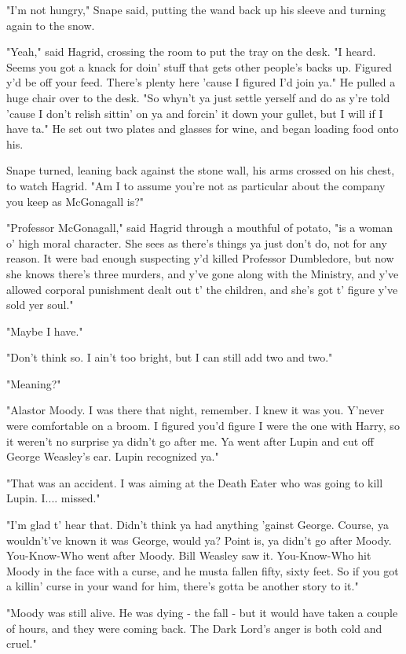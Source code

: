 "I'm not hungry," Snape said, putting the wand back up his sleeve and turning again to the snow.

"Yeah," said Hagrid, crossing the room to put the tray on the desk. "I heard. Seems you got a knack for doin' stuff that gets other people's backs up. Figured y'd be off your feed. There's plenty here 'cause I figured I'd join ya." He pulled a huge chair over to the desk. "So whyn't ya just settle yerself and do as y're told 'cause I don't relish sittin' on ya and forcin' it down your gullet, but I will if I have ta." He set out two plates and glasses for wine, and began loading food onto his.

Snape turned, leaning back against the stone wall, his arms crossed on his chest, to watch Hagrid. "Am I to assume you're not as particular about the company you keep as McGonagall is?"

"Professor McGonagall," said Hagrid through a mouthful of potato, "is a woman o' high moral character. She sees as there's things ya just don't do, not for any reason. It were bad enough suspecting y'd killed Professor Dumbledore, but now she knows there's three murders, and y've gone along with the Ministry, and y've allowed corporal punishment dealt out t' the children, and she's got t' figure y've sold yer soul."

"Maybe I have."

"Don't think so. I ain't too bright, but I can still add two and two."

"Meaning?"

"Alastor Moody. I was there that night, remember. I knew it was you. Y'never were comfortable on a broom. I figured you'd figure I were the one with Harry, so it weren't no surprise ya didn't go after me. Ya went after Lupin and cut off George Weasley's ear. Lupin recognized ya."

"That was an accident. I was aiming at the Death Eater who was going to kill Lupin. I.... missed."

"I'm glad t' hear that. Didn't think ya had anything 'gainst George. Course, ya wouldn't've known it was George, would ya? Point is, ya didn't go after Moody. You-Know-Who went after Moody. Bill Weasley saw it. You-Know-Who hit Moody in the face with a curse, and he musta fallen fifty, sixty feet. So if you got a killin' curse in your wand for him, there's gotta be another story to it."

"Moody was still alive. He was dying - the fall - but it would have taken a couple of hours, and they were coming back. The Dark Lord's anger is both cold and cruel."

